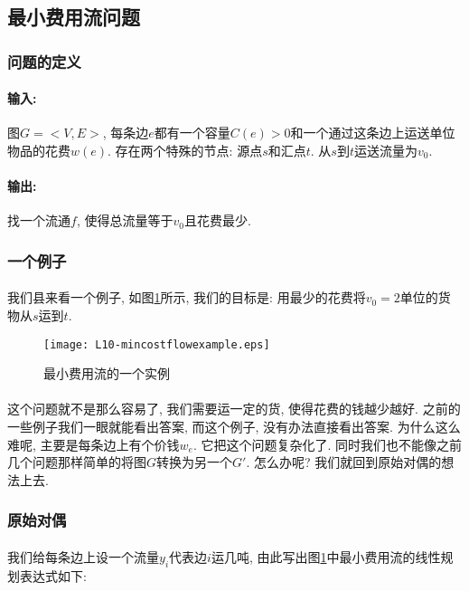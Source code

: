 \documentclass[a4paper]{article}
\renewcommand{\figurename}{图}
\begin{document}
        
    
    \subsection{最小费用流问题}
        \subsubsection*{问题的定义}
        \paragraph{输入:} 图$G=<V, E>$, 每条边$e$都有一个容量$C(e) > 0$和一个通过这条边上运送单位物品的{花费$w(e)$}. 存在两个特殊的节点: 源点$s$和汇点$t$. 从$s$到$t$运送流量为$v_0$.
        \paragraph{输出:}找一个流通$f$, 使得总流量等于$v_0$且花费最少.
        \subsubsection*{一个例子}
        \paragraph{}我们县来看一个例子, 如\figurename\ref{Figure: min_cost_flow_example}所示, 我们的目标是: 用最少的花费将$v_{0}=2$单位的货物从$s$运到$t$. 
        \begin{figure}[h]
            \centering
            \texttt{[image: L10-mincostflowexample.eps]}
            \caption{最小费用流的一个实例}
            \label{Figure: min_cost_flow_example}
        \end{figure}
        \paragraph{}这个问题就不是那么容易了, 我们需要运一定的货, 使得花费的钱越少越好. 之前的一些例子我们一眼就能看出答案, 而这个例子, 没有办法直接看出答案. 为什么这么难呢, 主要是每条边上有个价钱$w_{e}$. 它把这个问题复杂化了. 同时我们也不能像之前几个问题那样简单的将图$G$转换为另一个$G'$. 怎么办呢? 我们就回到原始对偶的想法上去.
        \subsubsection*{原始对偶}
        \paragraph{}我们给每条边上设一个流量$y_{i}$代表边$i$运几吨, 由此写出\figurename\ref{Figure: min_cost_flow_example}中最小费用流的线性规划表达式如下:
\end{document}
